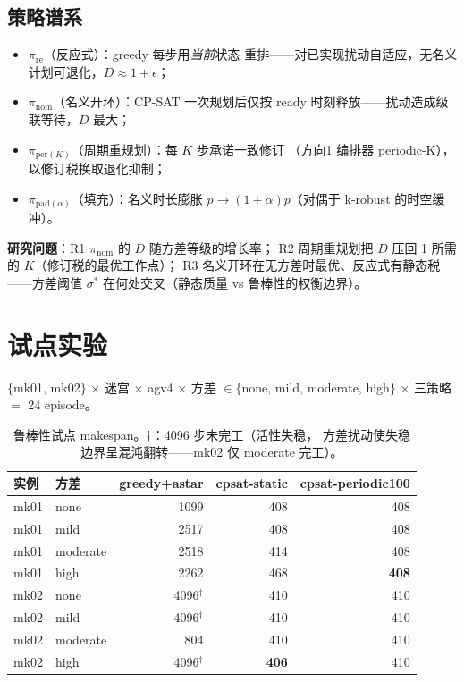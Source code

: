 \documentclass[UTF8,12pt,a4paper]{ctexart}
\begin{document}
\subsection{策略谱系}
\begin{itemize}
  \item $\pi_{\mathrm{re}}$（反应式）：greedy 每步用\emph{当前}状态
    重排——对已实现扰动自适应，无名义计划可退化，$D\approx 1+\epsilon$；
  \item $\pi_{\mathrm{nom}}$（名义开环）：CP-SAT 一次规划后仅按
    ready 时刻释放——扰动造成级联等待，$D$ 最大；
  \item $\pi_{\mathrm{per}(K)}$（周期重规划）：每 $K$ 步承诺一致修订
    （方向1 编排器 periodic-K），以修订税换取退化抑制；
  \item $\pi_{\mathrm{pad}(\alpha)}$（填充）：名义时长膨胀
    $p\to(1{+}\alpha)p$（对偶于 k-robust 的时空缓冲）。
\end{itemize}
\textbf{研究问题}：R1 $\pi_{\mathrm{nom}}$ 的 $D$ 随方差等级的增长率；
R2 周期重规划把 $D$ 压回 1 所需的 $K$（修订税的最优工作点）；
R3 名义开环在无方差时最优、反应式有静态税——方差阈值 $\sigma^*$
在何处交叉（静态质量 vs 鲁棒性的权衡边界）。

\section{试点实验}\label{sec:pilot}

$\{$mk01, mk02$\}$ $\times$ 迷宫 $\times$ agv4 $\times$ 方差
$\in\{$none, mild, moderate, high$\}$ $\times$ 三策略 $=$ 24 episode。

\begin{table}[h]
\centering
\begin{tabular}{llrrr}
\toprule
实例 & 方差 & greedy+astar & cpsat-static & cpsat-periodic100 \\
\midrule
mk01 & none      & 1099 & 408 & 408 \\
mk01 & mild      & 2517 & 408 & 408 \\
mk01 & moderate  & 2518 & 414 & 408 \\
mk01 & high      & 2262 & 468 & \textbf{408} \\
\midrule
mk02 & none      & 4096$^\dagger$ & 410 & 410 \\
mk02 & mild      & 4096$^\dagger$ & 410 & 410 \\
mk02 & moderate  & 804 & 410 & 410 \\
mk02 & high      & 4096$^\dagger$ & \textbf{406} & 410 \\
\bottomrule
\end{tabular}
\caption{鲁棒性试点 makespan。$\dagger$：4096 步未完工（活性失稳，
方差扰动使失稳边界呈混沌翻转——mk02 仅 moderate 完工）。}
\label{tab:robust}
\end{table}
\end{document}
